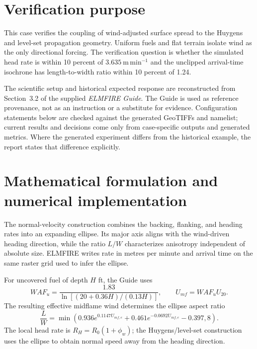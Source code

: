 \section{Verification purpose}

This case verifies the coupling of wind-adjusted surface spread to the Huygens and level-set propagation geometry.  Uniform fuels and flat terrain isolate wind as the only directional forcing.  The verification question is whether the simulated head rate is within 10 percent of \(3.635~\mathrm{m\,min^{-1}}\) and the unclipped arrival-time isochrone has length-to-width ratio within 10 percent of 1.24.

The scientific setup and historical expected response are reconstructed from Section~3.2 of the supplied \emph{ELMFIRE Guide}. The Guide is used as reference provenance, not as an instruction or a substitute for evidence. Configuration statements below are checked against the generated GeoTIFFs and namelist; current results and decisions come only from case-specific outputs and generated metrics. Where the generated experiment differs from the historical example, the report states that difference explicitly.

\section{Mathematical formulation and numerical implementation}

The normal-velocity construction combines the backing, flanking, and heading rates into an expanding ellipse.  Its major axis aligns with the wind-driven heading direction, while the ratio \(L/W\) characterizes anisotropy independent of absolute size.  ELMFIRE writes rate in metres per minute and arrival time on the same raster grid used to infer the ellipse.

For uncovered fuel of depth \(H\) ft, the Guide uses
\begin{equation}
WAF_u=\frac{1.83}{\ln[(20+0.36H)/(0.13H)]}, \qquad U_{mf}=WAF_uU_{20}.
\end{equation}
The resulting effective midflame wind determines the ellipse aspect ratio
\begin{equation}
\frac{L}{W}=\min\left(0.936e^{0.1147U_{mf,e}}+0.461e^{-0.0692U_{mf,e}}-0.397,8\right).
\end{equation}
The local head rate is \(R_H=R_0(1+\phi_w)\); the Huygens/level-set construction uses the ellipse to obtain normal speed away from the heading direction.

